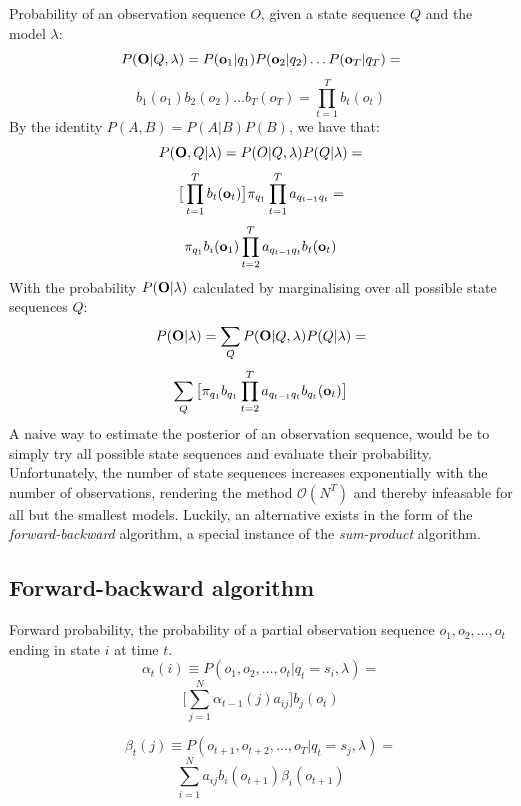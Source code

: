\documentclass[conference]{IEEEtran}
\begin{document}
Probability of an observation sequence $O$, given a state sequence $Q$ and the model $\lambda$:
\[
 P({\bf O}|Q,\lambda) = P({\bf o}_{1}|q_{1})P({\bf o}_{2}|q_{2})\ldots P({\bf o}_{T}|q_{T}) =
\]
\begin{equation}
  b_{1}(o_{1})b_{2}(o_{2}) \ldots b_{T}(o_{T}) = \prod_{t = 1}^{T}b_{t}(o_{t})
\end{equation}
By the identity $P(A,B) = P(A|B)P(B)$, we have that:
\[
 P({\bf O},Q|\lambda) = P(O|Q,\lambda)P(Q|\lambda) = 
\]
\[
 \big[ \prod_{t = 1}^{T}b_{t}({\bf o}_{t}) \big] \pi_{q_{1}} \prod_{t = 1}^{T} a_{q_{t-1}q_{t}} =
\]
\[
 \pi_{q_{1}} b_{i}({\bf o}_{1}) \prod_{t = 2}^{T} a_{q_{t-1}q_{t}}b_{t}({\bf o}_{t})
\]
With the probability $P({\bf O}|\lambda)$ calculated by marginalising over all possible state sequences $Q$:
\[
 P({\bf O}|\lambda) = \displaystyle \sum_{Q} P({\bf O}|Q,\lambda)P(Q|\lambda) = 
\]
\begin{equation}
 \displaystyle \sum_{Q} \big[ \pi_{q_{1}} b_{q_{1}} \prod_{t=2}^{T} a_{q_{t-1}q_{t}}b_{q_{t}}({\bf o}_{t}) \big]
\end{equation}
A naive way to estimate the posterior of an observation sequence, would be to simply try all possible state sequences and evaluate their probability. Unfortunately, the number of state sequences increases exponentially with the number of observations, rendering the method $\mathcal{O}(N^{T})$ and thereby infeasable for all but the smallest models. Luckily, an alternative exists in the form of the {\it forward-backward} algorithm, a special instance of the {\it sum-product} algorithm.
\subsection{Forward-backward algorithm}
Forward probability, the probability of a partial observation sequence $o_1, o_2, \ldots, o_t$ ending in state $i$ at time $t$.
\[
 \alpha_{t}(i) \equiv P(o_{1},o_{2},\ldots, o_{t}| q_{t} = s_{i}, \lambda) = 
\]
\begin{equation}
 \label{forwardProbability}
\displaystyle \Big [ \sum_{j=1}^{N}  \alpha_{t-1}(j) a_{ij} \Big ] b_{j}(o_{t})
\end{equation}

\[
  \beta_{t}(j) \equiv P(o_{t+1},o_{t+2},\ldots, o_{T}| q_{t} = s_{j}, \lambda) = 
\]
\begin{equation}
 \label{backwardProbability}
\displaystyle \sum_{i=1}^{N} a_{ij} b_{i}(o_{t+1}) \beta_{i}(o_{t+1})
\end{equation}
\end{document}
